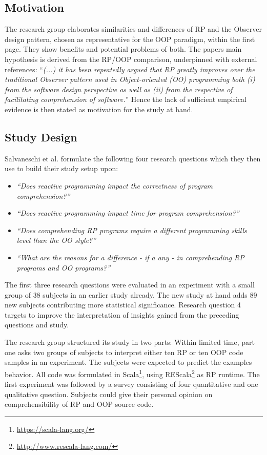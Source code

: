 \documentclass[12pt,a4paper]{article}
\begin{document}
\subsection{Motivation}
The research group elaborates similarities and differences of RP and the Observer design pattern, chosen as representative for the OOP paradigm, within the first page. They show benefits and potential problems of both. The papers main hypothesis is derived from the RP/OOP comparison, underpinned with external references: ``\emph{(...) it has been repeatedly argued that RP greatly improves over the traditional Observer pattern used in Object-oriented (OO) programming both (i) from the software design perspective as well as (ii) from the respective of facilitating comprehension of software.}'' \cite{7827078} Hence the lack of sufficient empirical evidence is then stated as motivation for the study at hand.

\subsection{Study Design}
Salvaneschi et al. \cite{7827078} formulate the following four research questions which they then use to build their study setup upon:

\begin{itemize}
	\item \emph{``Does reactive programming impact the correctness of program comprehension?''}
	\item \emph{``Does reactive programming impact time for program comprehension?''}
	\item \emph{``Does comprehending RP programs require a different programming skills level than the OO style?''}
	\item \emph{``What are the reasons for a difference - if a any - in comprehending RP programs and OO programs?''}
\end{itemize}

The first three research questions were evaluated in an experiment with a small group of 38 subjects in an earlier study \cite{Salvaneschi:2014:ESP:2635868.2635895} already. The new study at hand adds 89 new subjects contributing more statistical significance. Research question 4 targets to improve the interpretation of insights gained from the preceding questions and study.

The research group structured its study in two parts: Within limited time, part one asks two groups of subjects to interpret either ten RP or ten OOP code samples in an experiment. The subjects were expected to predict the examples behavior. All code was formulated in Scala\footnote{\url{https://scala-lang.org/}}, using REScala\footnote{\url{http://www.rescala-lang.com/}} as RP runtime. The first experiment was followed by a survey consisting of four quantitative and one qualitative question. Subjects could give their personal opinion on comprehensibility of RP and OOP source code.
\end{document}
